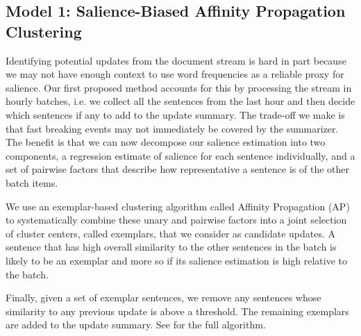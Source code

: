 \subsection{Model 1: Salience-Biased Affinity Propagation Clustering}  
\label{sec:sapmodel}


%  

  Identifying potential updates from the document stream is hard in part
  because we may not have enough context to use word frequencies as a 
  reliable proxy for salience. 
  Our first proposed method accounts for this
  by
  processing the stream in hourly batches, i.e. we collect all the
  sentences from the last hour and then decide which sentences if any to
  add to the update summary. The trade-off we make is that fast breaking
  events may not immediately be covered by the summarizer. The benefit
  is that we can now decompose our salience estimation into two components,
  a regression estimate of salience for each sentence individually,
  and a set of pairwise factors that describe how representative a sentence 
  is of the other batch items. 


%   

  We use an exemplar-based clustering algorithm
  called Affinity Propagation (AP) \citep{frey2007clustering}
  to systematically combine these unary and pairwise factors into a joint 
  selection of cluster centers, called exemplars, that we consider as 
  candidate updates.
  A sentence that has high overall similarity to
  the other sentences in the batch is likely to be an exemplar and
  more so if its salience estimation is high relative to the batch.



  
  
  Finally, given a set of exemplar sentences, we remove any
  sentences whose similarity to any previous update is above a threshold.
  The remaining exemplars are added to the update summary.
  See \cite{kedzie2015predicting} for the full algorithm.



